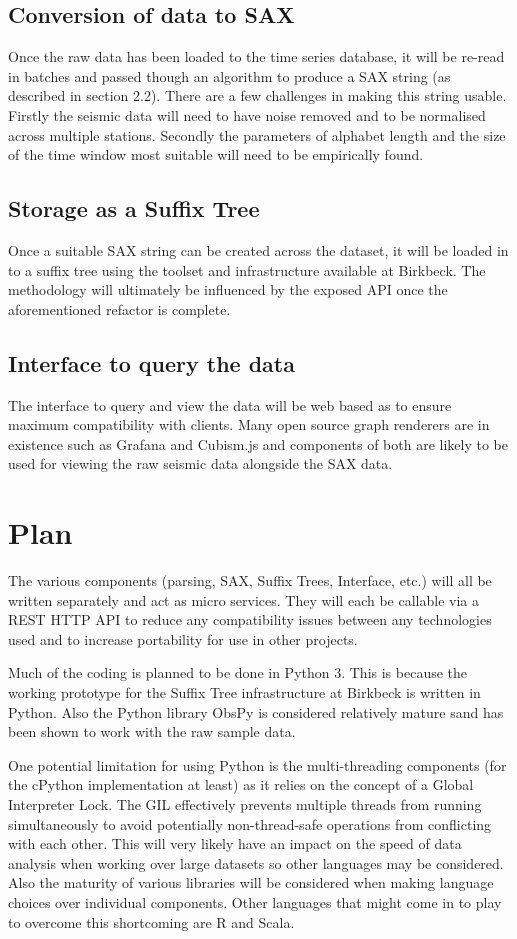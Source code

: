 \documentclass[11pt]{scrartcl}
\begin{document}
\subsection{Conversion of data to SAX}
	Once the raw data has been loaded to the time series database, it will be re-read in batches and passed though an algorithm to produce a SAX string (as described in section 2.2).  There are a few challenges in making this string usable.  Firstly the seismic data will need to have noise removed and to be normalised across multiple stations.  Secondly the parameters of alphabet length and the size of the time window most suitable will need to be empirically found.
	
\subsection{Storage as a Suffix Tree}
	Once a suitable SAX string can be created across the dataset, it will be loaded in to a suffix tree using the toolset and infrastructure available at Birkbeck.  The methodology will ultimately be influenced by the exposed API once the aforementioned refactor is complete.

\subsection{Interface to query the data}
	The interface to query and view the data will be web based as to ensure maximum compatibility with clients.  Many open source graph renderers are in existence such as Grafana and Cubism.js and components of both are likely to be used for viewing the raw seismic data alongside the SAX data.

\section{Plan}
	The various components (parsing, SAX, Suffix Trees, Interface, etc.) will all be written separately and act as micro services.  They will each be callable via a REST HTTP API to reduce any compatibility issues between any technologies used and to increase portability for use in other projects.

	Much of the coding is planned to be done in Python 3.  This is because the working prototype for the Suffix Tree infrastructure at Birkbeck is written in Python.  Also the Python library ObsPy is considered relatively mature sand has been shown to work with the raw sample data.
	
	One potential limitation for using Python is the multi-threading components (for the cPython implementation at least) as it relies on the concept of a Global Interpreter Lock.  The GIL effectively prevents multiple threads from running simultaneously to avoid potentially non-thread-safe operations from conflicting with each other.  This will very likely have an impact on the speed of data analysis when working over large datasets so other languages may be considered.  Also the maturity of various libraries will be considered when making language choices over individual components.  Other languages that might come in to play to overcome this shortcoming are R and Scala.
	
\end{document}
